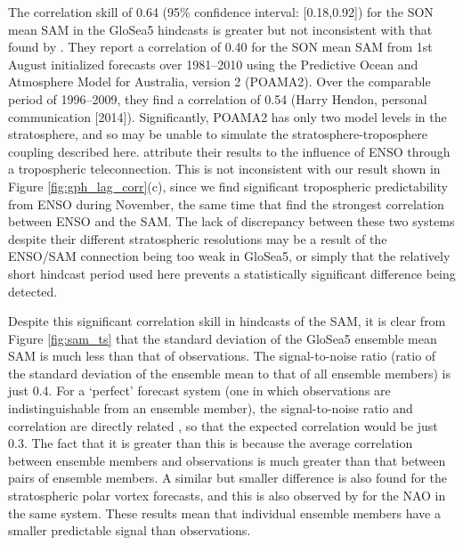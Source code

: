 The correlation skill of 0.64 (95\% confidence interval: [0.18,0.92]) for the
SON mean SAM in the GloSea5 hindcasts is greater but not inconsistent with that
found by \citet{Lim2013}. They report a correlation of 0.40 for the SON mean SAM
from 1st August initialized forecasts over 1981--2010 using the Predictive Ocean
and Atmosphere Model for Australia, version 2 (POAMA2). Over the comparable
period of 1996--2009, they find a correlation of 0.54 (Harry Hendon, personal
communication [2014]).  Significantly, POAMA2 has only two model levels in the
stratosphere, and so may be unable to simulate the stratosphere-troposphere
coupling described here. \citet{Lim2013} attribute their results to the
influence of ENSO through a tropospheric teleconnection. This is not
inconsistent with our result shown in Figure \ref{fig:gph_lag_corr}(c), since we
find significant tropospheric predictability from ENSO during November, the same
time that \citet{Lim2013} find the strongest correlation between ENSO and the
SAM. The lack of discrepancy between these two systems despite their different
stratospheric resolutions may be a result of the ENSO/SAM connection being too
weak in GloSea5, or simply that the relatively short hindcast period used here
prevents a statistically significant difference being detected.

Despite this significant correlation skill in hindcasts of the SAM, it is clear
from Figure \ref{fig:sam_ts} that the standard deviation of the GloSea5 ensemble
mean SAM is much less than that of observations. The signal-to-noise ratio
(ratio of the standard deviation of the ensemble mean to that of all ensemble
members) is just 0.4. For a `perfect' forecast system (one in which observations
are indistinguishable from an ensemble member), the signal-to-noise ratio and
correlation are directly related \citep{Kumar2009}, so that the expected
correlation would be just 0.3. The fact that it is greater than this is because
the average correlation between ensemble members and observations is much
greater than that between pairs of ensemble members. A similar but smaller
difference is also found for the stratospheric polar vortex forecasts, and this
is also observed by \citet{Scaife2013} for the NAO in the same system. These
results mean that individual ensemble members have a smaller predictable signal
than observations.

